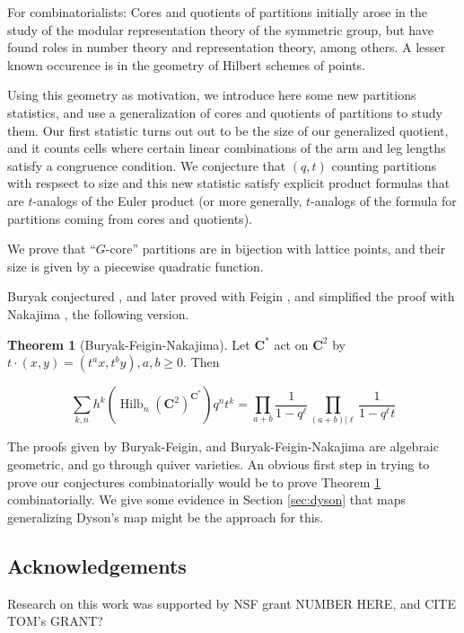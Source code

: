 \documentclass{amsart}[12pt]
\theoremstyle{definition}
\newtheorem{theorem}[dummy]{Theorem}
\newcommand{\C}{\mathbf{C}}
\DeclareMathOperator{\Hilb}{Hilb}
\begin{document}
For combinatorialists: Cores and quotients of partitions initially arose in the study of the modular representation theory of the symmetric group, but have found roles in number theory and representation theory, among others.  A lesser known occurence is in the geometry of Hilbert schemes of points.  

Using this geometry as motivation, we introduce here some new partitions statistics, and use a generalization of cores and quotients of partitions to study them.  Our first statistic turns out out to be the size of our generalized quotient, and it counts cells where certain linear combinations of the arm and leg lengths satisfy a congruence condition.  We conjecture that $(q,t)$ counting partitions with respsect to size and this new statistic satisfy explicit product formulas that are $t$-analogs of the Euler product (or more generally, $t$-analogs of the formula for partitions coming from cores and quotients).  

We prove that ``$G$-core'' partitions are in bijection with lattice points, and their size is given by a piecewise quadratic function.  




Buryak conjectured \cite{Buryak}, and later proved with Feigin \cite{BF}, and simplified the proof with Nakajima \cite{BFN}, the following version. 

\begin{theorem}[Buryak-Feigin-Nakajima] \label{thm:BFN}
Let $\C^*$ act on $\C^2$ by $t\cdot (x,y)=(t^ax, t^by), a,b\geq 0$.  Then

$$\sum_{k,n} h^k(\Hilb_n(\C^2)^{\C^*})q^nt^k=\prod_{a+b } \frac{1}{1-q^\ell}\prod_{(a+b)|\ell} \frac{1}{1-q^\ell t}$$
\end{theorem}

The proofs given by Buryak-Feigin, and Buryak-Feigin-Nakajima are algebraic geometric, and go through quiver varieties.  An obvious first step in trying to prove our conjectures combinatorially would be to prove Theorem \ref{thm:BFN} combinatorially.  We give some evidence in Section \ref{sec:dyson} that maps generalizing Dyson's map might be the approach for this.



\subsection{Acknowledgements}

Research on this work was supported by NSF grant NUMBER HERE, and CITE TOM's GRANT?
\end{document}
